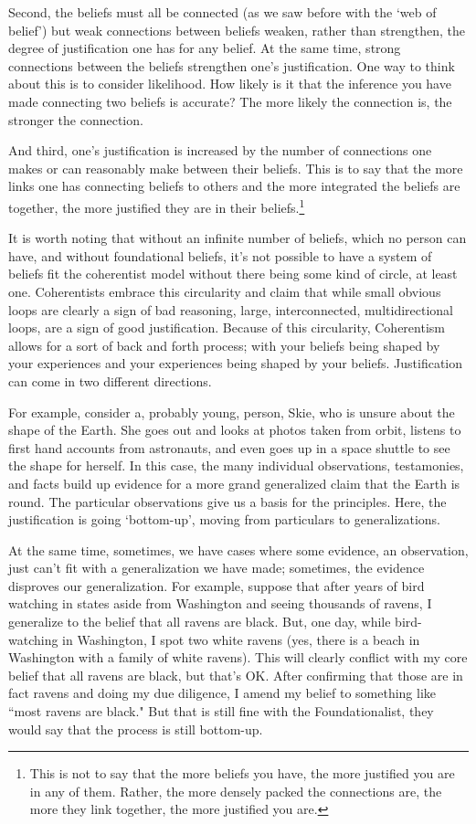 Second, the beliefs must all be connected (as we saw before with the `web of belief') but weak connections between beliefs weaken, rather than strengthen, the degree of justification one has for any belief. At the same time, strong connections between the beliefs strengthen one's justification. One way to think about this is to consider likelihood. How likely is it that the inference you have made connecting two beliefs is accurate? The more likely the connection is, the stronger the connection. 

And third, one's justification is increased by the number of connections one makes or can reasonably make between their beliefs. This is to say that the more links one has connecting beliefs to others and the more integrated the beliefs are together, the more justified they are in their beliefs.\footnote{This is not to say that the more beliefs you have, the more justified you are in any of them. Rather, the more densely packed the connections are, the more they link together, the more justified you are.}   

It is worth noting that without an infinite number of beliefs, which no person can have, and without foundational beliefs, it's not possible to have a system of beliefs fit the coherentist model without there being some kind of circle, at least one. Coherentists embrace this circularity and claim that while small obvious loops are clearly a sign of bad reasoning, large, interconnected, multidirectional loops, are a sign of good justification. Because of this circularity, Coherentism allows for a sort of back and forth process; with your beliefs being shaped by your experiences and your experiences being shaped by your beliefs. Justification can come in two different directions. 

For example, consider a, probably young, person, Skie, who is unsure about the shape of the Earth. She goes out and looks at photos taken from orbit, listens to first hand accounts from astronauts, and even goes up in a space shuttle to see the shape for herself. In this case, the many individual observations, testamonies, and facts build up evidence for a more grand generalized claim that the Earth is round. The particular observations give us a basis for the principles. Here, the justification is going `bottom-up', moving from particulars to generalizations. 

At the same time, sometimes, we have cases where some evidence, an observation, just can't fit with a generalization we have made; sometimes, the evidence disproves our generalization. For example, suppose that after years of bird watching in states aside from Washington and seeing thousands of ravens, I generalize to the belief that all ravens are black. But, one day, while bird-watching in Washington, I spot two white ravens (yes, there is a beach in Washington with a family of white ravens). This will clearly conflict with my core belief that all ravens are black, but that's OK. After confirming that those are in fact ravens and doing my due diligence, I amend my belief to something like ``most ravens are black." But that is still fine with the Foundationalist, they would say that the process is still bottom-up.  

